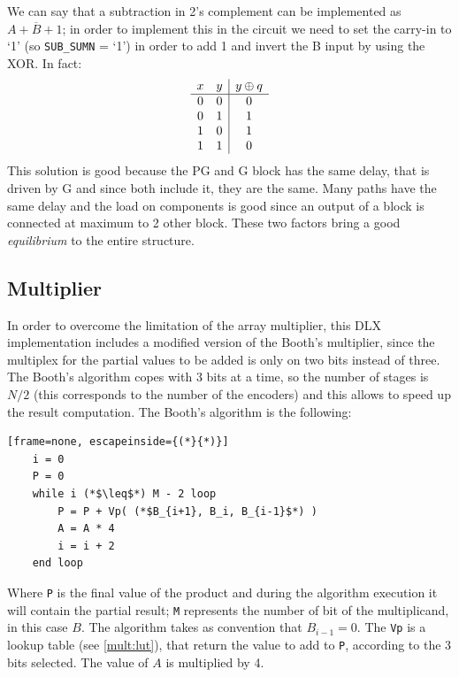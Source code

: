 We can say that a subtraction in 2's complement can be implemented as $A + \overline{B} + 1$; in order to implement this in the circuit we need to set the carry-in to `1' (so \texttt{SUB\_SUMN} = `1') in order to add 1 and invert the B input by using the XOR. In fact:
\begin{displaymath}
	\begin{array}{c c|c}
		x & y & y \oplus q\\ %
		\hline %
		0 & 0 & 0\\
		0 & 1 & 1\\
		1 & 0 & 1\\
		1 & 1 & 0\\
	\end{array}
\end{displaymath}
This solution is good because the PG and G block has the same delay, that is driven by G and since both include it, they are the same. Many paths have the same delay and the load on components is good since an output of a block is connected at maximum to 2 other block. These two factors bring a good \textit{equilibrium} to the entire structure.
\subsection{Multiplier}
In order to overcome the limitation of the array multiplier, this DLX implementation includes a modified version of the Booth's multiplier, since the multiplex for the partial values to be added is only on two bits instead of three. The Booth's algorithm copes with 3 bits at a time, so the number of stages is $N/2$ (this corresponds to the number of the encoders) and this allows to speed up the result computation. 
The Booth's algorithm is the following:
\begin{lstlisting}[frame=none, escapeinside={(*}{*)}]
	i = 0
	P = 0
	while i (*$\leq$*) M - 2 loop
		P = P + Vp( (*$B_{i+1}, B_i, B_{i-1}$*) )
		A = A * 4
		i = i + 2
	end loop
\end{lstlisting}
Where \texttt{P} is the final value of the product and during the algorithm execution it will contain the partial result; \texttt{M} represents the number of bit of the multiplicand, in this case $B$. The algorithm takes as convention that $B_{i-1} = 0$. The \texttt{Vp} is a lookup table (see \ref{mult:lut}), that return the value to add to \texttt{P}, according to the 3 bits selected. The value of $A$ is multiplied by 4.

